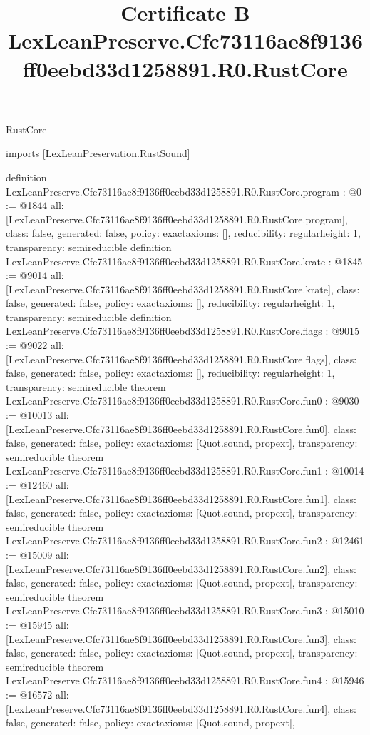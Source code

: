 \begin{lexlean}{RustCore}
\title{Certificate B LexLeanPreserve.Cfc73116ae8f9136ff0eebd33d1258891.R0.RustCore}
\begin{coremodule}
imports [LexLeanPreservation.RustSound]

definition LexLeanPreserve.Cfc73116ae8f9136ff0eebd33d1258891.R0.RustCore.program : @0 := @1844 {
  all: [LexLeanPreserve.Cfc73116ae8f9136ff0eebd33d1258891.R0.RustCore.program],
  class: false,
  generated: false,
  policy: exact{axioms: []},
  reducibility: regular{height: 1},
  transparency: semireducible
}
definition LexLeanPreserve.Cfc73116ae8f9136ff0eebd33d1258891.R0.RustCore.krate : @1845 := @9014 {
  all: [LexLeanPreserve.Cfc73116ae8f9136ff0eebd33d1258891.R0.RustCore.krate],
  class: false,
  generated: false,
  policy: exact{axioms: []},
  reducibility: regular{height: 1},
  transparency: semireducible
}
definition LexLeanPreserve.Cfc73116ae8f9136ff0eebd33d1258891.R0.RustCore.flags : @9015 := @9022 {
  all: [LexLeanPreserve.Cfc73116ae8f9136ff0eebd33d1258891.R0.RustCore.flags],
  class: false,
  generated: false,
  policy: exact{axioms: []},
  reducibility: regular{height: 1},
  transparency: semireducible
}
theorem LexLeanPreserve.Cfc73116ae8f9136ff0eebd33d1258891.R0.RustCore.fun0 : @9030 := @10013 {
  all: [LexLeanPreserve.Cfc73116ae8f9136ff0eebd33d1258891.R0.RustCore.fun0],
  class: false,
  generated: false,
  policy: exact{axioms: [Quot.sound, propext]},
  transparency: semireducible
}
theorem LexLeanPreserve.Cfc73116ae8f9136ff0eebd33d1258891.R0.RustCore.fun1 : @10014 := @12460 {
  all: [LexLeanPreserve.Cfc73116ae8f9136ff0eebd33d1258891.R0.RustCore.fun1],
  class: false,
  generated: false,
  policy: exact{axioms: [Quot.sound, propext]},
  transparency: semireducible
}
theorem LexLeanPreserve.Cfc73116ae8f9136ff0eebd33d1258891.R0.RustCore.fun2 : @12461 := @15009 {
  all: [LexLeanPreserve.Cfc73116ae8f9136ff0eebd33d1258891.R0.RustCore.fun2],
  class: false,
  generated: false,
  policy: exact{axioms: [Quot.sound, propext]},
  transparency: semireducible
}
theorem LexLeanPreserve.Cfc73116ae8f9136ff0eebd33d1258891.R0.RustCore.fun3 : @15010 := @15945 {
  all: [LexLeanPreserve.Cfc73116ae8f9136ff0eebd33d1258891.R0.RustCore.fun3],
  class: false,
  generated: false,
  policy: exact{axioms: [Quot.sound, propext]},
  transparency: semireducible
}
theorem LexLeanPreserve.Cfc73116ae8f9136ff0eebd33d1258891.R0.RustCore.fun4 : @15946 := @16572 {
  all: [LexLeanPreserve.Cfc73116ae8f9136ff0eebd33d1258891.R0.RustCore.fun4],
  class: false,
  generated: false,
  policy: exact{axioms: [Quot.sound, propext]},
}
\end{coremodule}
\end{lexlean}
